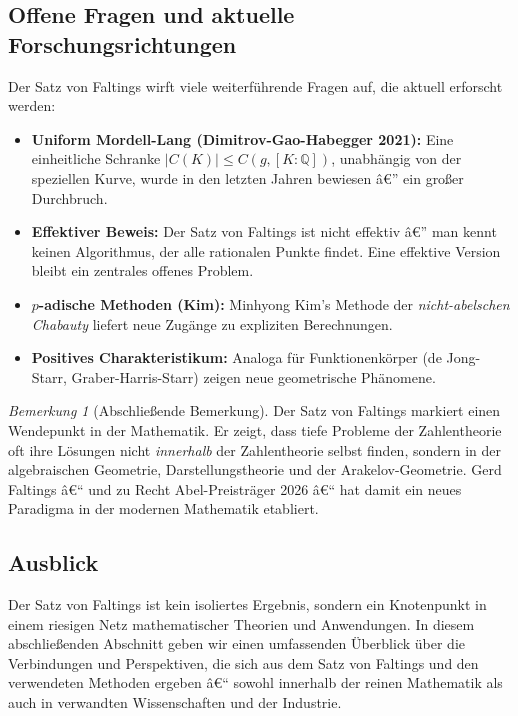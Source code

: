 ﻿\documentclass[12pt,a4paper]{article}
\theoremstyle{plain}
\theoremstyle{definition}
\theoremstyle{remark}
\newtheorem{remark}[theorem]{Bemerkung}
\newcommand{\Q}{\mathbb{Q}}
\begin{document}
\subsection{Offene Fragen und aktuelle Forschungsrichtungen}

Der Satz von Faltings wirft viele weiterführende Fragen auf, die aktuell erforscht werden:

\begin{itemize}
  \item \textbf{Uniform Mordell-Lang (Dimitrov-Gao-Habegger 2021):}
    Eine einheitliche Schranke $|C(K)| \leq C(g, [K:\Q])$, unabhängig von der speziellen Kurve,
    wurde in den letzten Jahren bewiesen â€” ein großer Durchbruch.
  \item \textbf{Effektiver Beweis:} Der Satz von Faltings ist nicht effektiv â€” man kennt
    keinen Algorithmus, der alle rationalen Punkte findet. Eine effektive Version
    bleibt ein zentrales offenes Problem.
  \item \textbf{$p$-adische Methoden (Kim):} Minhyong Kim's Methode der
    \emph{nicht-abelschen Chabauty} liefert neue Zugänge zu expliziten Berechnungen.
  \item \textbf{Positives Charakteristikum:} Analoga für Funktionenkörper
    (de Jong-Starr, Graber-Harris-Starr) zeigen neue geometrische Phänomene.
\end{itemize}

\bigskip

\begin{remark}[Abschließende Bemerkung]\label{rem:abschluss}
Der Satz von Faltings markiert einen Wendepunkt in der Mathematik.
Er zeigt, dass tiefe Probleme der Zahlentheorie oft ihre Lösungen
nicht \emph{innerhalb} der Zahlentheorie selbst finden, sondern in der
algebraischen Geometrie, Darstellungstheorie und der Arakelov-Geometrie.
Gerd Faltings â€“ und zu Recht Abel-Preisträger 2026 â€“ hat damit
ein neues Paradigma in der modernen Mathematik etabliert.
\end{remark}

\subsection{Ausblick}

Der Satz von Faltings ist kein isoliertes Ergebnis, sondern ein Knotenpunkt in einem
riesigen Netz mathematischer Theorien und Anwendungen. In diesem abschließenden Abschnitt
geben wir einen umfassenden Überblick über die Verbindungen und Perspektiven, die sich
aus dem Satz von Faltings und den verwendeten Methoden ergeben â€“ sowohl innerhalb der
reinen Mathematik als auch in verwandten Wissenschaften und der Industrie.
\end{document}
